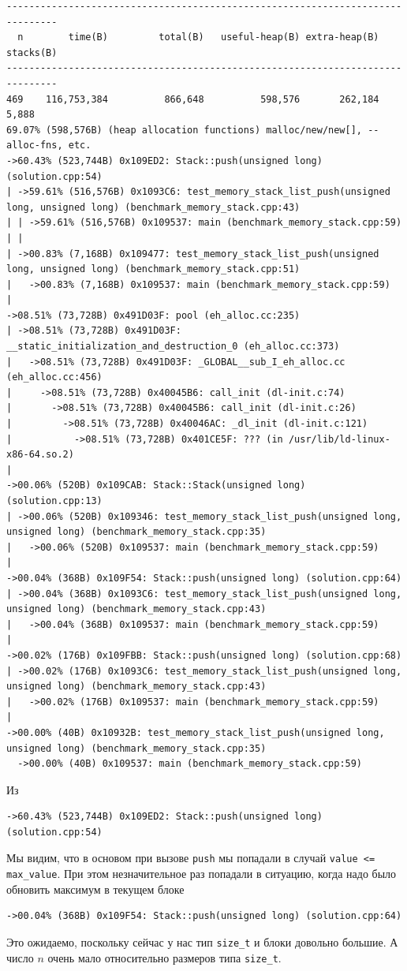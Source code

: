 \begin{lstlisting}[caption={}, label={}, style=style_code_block]
-------------------------------------------------------------------------------
  n        time(B)         total(B)   useful-heap(B) extra-heap(B)   stacks(B)
-------------------------------------------------------------------------------
469    116,753,384          866,648          598,576       262,184        5,888
69.07% (598,576B) (heap allocation functions) malloc/new/new[], --alloc-fns, etc.
->60.43% (523,744B) 0x109ED2: Stack::push(unsigned long) (solution.cpp:54)
| ->59.61% (516,576B) 0x1093C6: test_memory_stack_list_push(unsigned long, unsigned long) (benchmark_memory_stack.cpp:43)
| | ->59.61% (516,576B) 0x109537: main (benchmark_memory_stack.cpp:59)
| |   
| ->00.83% (7,168B) 0x109477: test_memory_stack_list_push(unsigned long, unsigned long) (benchmark_memory_stack.cpp:51)
|   ->00.83% (7,168B) 0x109537: main (benchmark_memory_stack.cpp:59)
|     
->08.51% (73,728B) 0x491D03F: pool (eh_alloc.cc:235)
| ->08.51% (73,728B) 0x491D03F: __static_initialization_and_destruction_0 (eh_alloc.cc:373)
|   ->08.51% (73,728B) 0x491D03F: _GLOBAL__sub_I_eh_alloc.cc (eh_alloc.cc:456)
|     ->08.51% (73,728B) 0x40045B6: call_init (dl-init.c:74)
|       ->08.51% (73,728B) 0x40045B6: call_init (dl-init.c:26)
|         ->08.51% (73,728B) 0x40046AC: _dl_init (dl-init.c:121)
|           ->08.51% (73,728B) 0x401CE5F: ??? (in /usr/lib/ld-linux-x86-64.so.2)
|             
->00.06% (520B) 0x109CAB: Stack::Stack(unsigned long) (solution.cpp:13)
| ->00.06% (520B) 0x109346: test_memory_stack_list_push(unsigned long, unsigned long) (benchmark_memory_stack.cpp:35)
|   ->00.06% (520B) 0x109537: main (benchmark_memory_stack.cpp:59)
|     
->00.04% (368B) 0x109F54: Stack::push(unsigned long) (solution.cpp:64)
| ->00.04% (368B) 0x1093C6: test_memory_stack_list_push(unsigned long, unsigned long) (benchmark_memory_stack.cpp:43)
|   ->00.04% (368B) 0x109537: main (benchmark_memory_stack.cpp:59)
|     
->00.02% (176B) 0x109FBB: Stack::push(unsigned long) (solution.cpp:68)
| ->00.02% (176B) 0x1093C6: test_memory_stack_list_push(unsigned long, unsigned long) (benchmark_memory_stack.cpp:43)
|   ->00.02% (176B) 0x109537: main (benchmark_memory_stack.cpp:59)
|     
->00.00% (40B) 0x10932B: test_memory_stack_list_push(unsigned long, unsigned long) (benchmark_memory_stack.cpp:35)
  ->00.00% (40B) 0x109537: main (benchmark_memory_stack.cpp:59)
\end{lstlisting}
Из 
\begin{lstlisting}[caption={}, label={}, style=style_code_block]
->60.43% (523,744B) 0x109ED2: Stack::push(unsigned long) (solution.cpp:54)
\end{lstlisting}
Мы видим, что в основом при вызове \texttt{push} мы попадали в случай \texttt{value <= max_value}. При этом незначительное раз попадали в ситуацию, когда надо было обновить максимум в текущем блоке
\begin{lstlisting}[caption={}, label={}, style=style_code_block]
->00.04% (368B) 0x109F54: Stack::push(unsigned long) (solution.cpp:64)
\end{lstlisting}
Это ожидаемо, поскольку сейчас у нас тип \texttt{size_t} и блоки довольно большие. А число \(n\) очень мало относительно размеров типа \texttt{size_t}.

